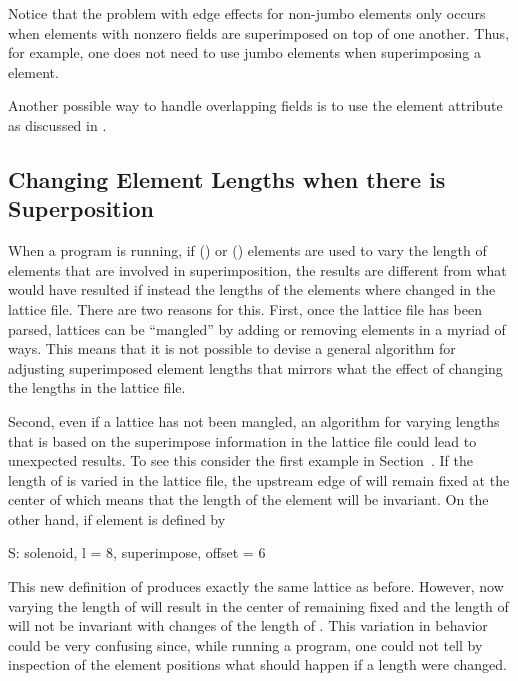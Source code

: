 Notice that the problem with edge effects for non-jumbo
 elements only occurs when elements with nonzero
fields are superimposed on top of one another. Thus, for example, one
does not need to use jumbo elements when superimposing a 
element.

Another possible way to handle overlapping fields is to use the 
element attribute as discussed in .

\subsection{Changing Element Lengths when there is Superposition}
\label{s:super.length}

When a program is running, if  () or  ()
elements are used to vary the length of elements that are involved in superimposition, the results
are different from what would have resulted if instead the lengths of the elements where changed in
the lattice file. There are two reasons for this. First, once the lattice file has been parsed,
lattices can be ``mangled'' by adding or removing elements in a myriad of ways. This means that it
is not possible to devise a general algorithm for adjusting superimposed element lengths that
mirrors what the effect of changing the lengths in the lattice file.

Second, even if a lattice has not been mangled, an algorithm for varying lengths that is based on
the superimpose information in the lattice file could lead to unexpected results. To see this
consider the first example in Section~. If the length of  is varied in the
lattice file, the upstream edge of  will remain fixed at the center of  which means that
the length of the  element  will be invariant. On the other hand, if
element  is defined by
\begin{example}
  S: solenoid, l = 8, superimpose, offset = 6
\end{example}
This new definition of  produces exactly the same lattice as before. However, now varying the
length of  will result in the center of  remaining fixed and the length of 
will not be invariant with changes of the length of . This variation in behavior could be very
confusing since, while running a program, one could not tell by inspection of the element positions
what should happen if a length were changed.

